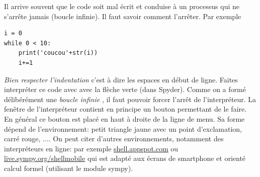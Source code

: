 Il arrive souvent que le code soit mal écrit et conduise à un processus qui ne s'arrête jamais (boucle infinie). Il faut savoir comment l'arrêter.
Par exemple
 \begin{verbatim}
i = 0
while 0 < 10:
    print('coucou'+str(i))
    i+=1
 \end{verbatim}
\emph{Bien respecter l'indentation} c'est à dire les espaces en début de ligne. Faites interpréter ce code avec avec la flèche verte (dans Spyder). Comme on a formé délibérément une \emph{boucle infinie} , il faut pouvoir forcer l'arrêt de l'interpréteur. La fenêtre de l'interpréteur contient en principe un bouton permettant de le faire. En général ce bouton est placé en haut à droite de la ligne de menu. Sa forme dépend de l'environnement: petit triangle jaune avec un point d'exclamation, carré rouge, ....
On peut citer d'autres environnements, notamment des interpréteurs en ligne: par exemple \href{http://shell.appspot.com}{shell.appspot.com} ou \href{http://live.sympy.org/shellmobile}{live.sympy.org/shellmobile} qui est adapté aux écrans de smartphone et orienté calcul formel  (utilisant le module sympy). 
